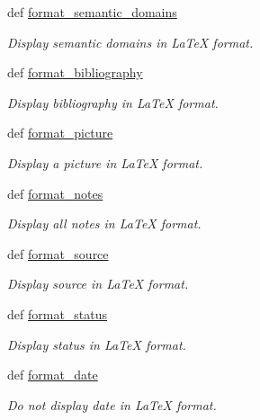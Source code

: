 \begin{DoxyCompactItemize}
def \hyperlink{namespacelmf_1_1src_1_1output_1_1tex_a3ffcbb1f8e1432f650d0e0b8b1177543}{format\+\_\+semantic\+\_\+domains}
\begin{DoxyCompactList}\small\item\em Display semantic domains in La\+Te\+X format. \end{DoxyCompactList}\item 
def \hyperlink{namespacelmf_1_1src_1_1output_1_1tex_aae400c8f0cdd2e08c20377c6ed7b2dcc}{format\+\_\+bibliography}
\begin{DoxyCompactList}\small\item\em Display bibliography in La\+Te\+X format. \end{DoxyCompactList}\item 
def \hyperlink{namespacelmf_1_1src_1_1output_1_1tex_a6d8e82577b0cfde12afdc47800615332}{format\+\_\+picture}
\begin{DoxyCompactList}\small\item\em Display a picture in La\+Te\+X format. \end{DoxyCompactList}\item 
def \hyperlink{namespacelmf_1_1src_1_1output_1_1tex_a3a5f6fdc200d161c1e65d79e217dc4e1}{format\+\_\+notes}
\begin{DoxyCompactList}\small\item\em Display all notes in La\+Te\+X format. \end{DoxyCompactList}\item 
def \hyperlink{namespacelmf_1_1src_1_1output_1_1tex_a54b44cdb2da8e53a85e6c541772ade76}{format\+\_\+source}
\begin{DoxyCompactList}\small\item\em Display source in La\+Te\+X format. \end{DoxyCompactList}\item 
def \hyperlink{namespacelmf_1_1src_1_1output_1_1tex_ac38ff95f9228aaa2e3a4412fd3b04773}{format\+\_\+status}
\begin{DoxyCompactList}\small\item\em Display status in La\+Te\+X format. \end{DoxyCompactList}\item 
def \hyperlink{namespacelmf_1_1src_1_1output_1_1tex_a43ca1be807ad687521d4e5f9994a1442}{format\+\_\+date}
\begin{DoxyCompactList}\small\item\em Do not display date in La\+Te\+X format. \end{DoxyCompactList}\end{DoxyCompactItemize}


